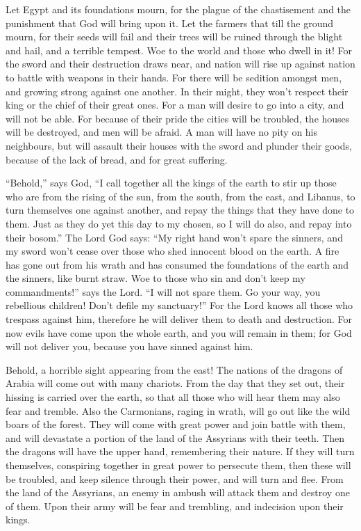  Let Egypt and its foundations mourn, for the plague of the
chastisement and the punishment that God will bring upon it.
 Let the farmers that till the ground mourn, for their
seeds will fail and their trees will be ruined through the blight and
hail, and a terrible tempest.  Woe to the world and those
who dwell in it!  For the sword and their destruction draws
near, and nation will rise up against nation to battle with weapons in
their hands.  For there will be sedition amongst men, and
growing strong against one another. In their might, they won't respect
their king or the chief of their great ones.  For a man
will desire to go into a city, and will not be able.  For
because of their pride the cities will be troubled, the houses will be
destroyed, and men will be afraid.  A man will have no pity
on his neighbours, but will assault their houses with the sword and
plunder their goods, because of the lack of bread, and for great
suffering.

 ``Behold,'' says God, ``I call together all the kings of
the earth to stir up those who are from the rising of the sun, from the
south, from the east, and Libanus, to turn themselves one against
another, and repay the things that they have done to them. 
Just as they do yet this day to my chosen, so I will do also, and repay
into their bosom.'' The Lord God says:  ``My right hand
won't spare the sinners, and my sword won't cease over those who shed
innocent blood on the earth.  A fire has gone out from his
wrath and has consumed the foundations of the earth and the sinners,
like burnt straw.  Woe to those who sin and don't keep my
commandments!'' says the Lord.  ``I will not spare them. Go
your way, you rebellious children! Don't defile my sanctuary!''
 For the Lord knows all those who trespass against him,
therefore he will deliver them to death and destruction. 
For now evils have come upon the whole earth, and you will remain in
them; for God will not deliver you, because you have sinned against him.

 Behold, a horrible sight appearing from the east!
 The nations of the dragons of Arabia will come out with
many chariots. From the day that they set out, their hissing is carried
over the earth, so that all those who will hear them may also fear and
tremble.  Also the Carmonians, raging in wrath, will go out
like the wild boars of the forest. They will come with great power and
join battle with them, and will devastate a portion of the land of the
Assyrians with their teeth.  Then the dragons will have the
upper hand, remembering their nature. If they will turn themselves,
conspiring together in great power to persecute them,  then
these will be troubled, and keep silence through their power, and will
turn and flee.  From the land of the Assyrians, an enemy in
ambush will attack them and destroy one of them. Upon their army will be
fear and trembling, and indecision upon their kings.

